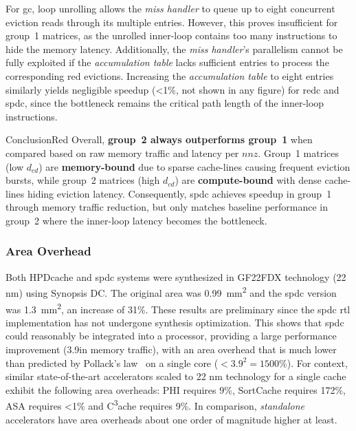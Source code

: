 For \acrshort{gc}, loop unrolling allows the \textit{miss handler} to queue up to eight concurrent \gls{eviction} reads through its multiple entries.
However, this proves insufficient for group~1 matrices, as the unrolled inner-loop contains too many instructions to hide the memory latency.
Additionally, the \textit{miss handler}'s parallelism cannot be fully exploited if the \textit{accumulation table} lacks sufficient entries to process the corresponding \acrshort{red} \glspl{eviction}.
Increasing the \textit{accumulation table} to eight entries similarly yields negligible speedup (<1\%, not shown in any figure) for \acrshort{redc} and \acrlong{spdc}, since the bottleneck remains the critical path length of the inner-loop instructions.

\begin{highlight}{Conclusion}{Red}
    Overall, \textbf{group~2 always outperforms group~1} when compared based on raw memory traffic and latency per $\mathit{nnz}$.
    Group~1 matrices (low $d_{\mathit{cd}}$) are \textbf{memory-bound} due to sparse cache-lines causing frequent \gls{eviction} bursts, while group~2 matrices (high $d_{\mathit{cd}}$) are \textbf{compute-bound} with dense cache-lines hiding \gls{eviction} latency.
    Consequently, \acrlong{spdc} achieves speedup in group~1 through memory traffic reduction, but only matches baseline performance in group~2 where the inner-loop latency becomes the bottleneck.
\end{highlight}

\subsubsection{Area Overhead}

Both HPDcache and \acrlong{spdc} systems were synthesized in GF22FDX technology (22 nm) using Synopsis DC\texttrademark.
The original area was 0.99~mm\textsuperscript{2} and the \acrlong{spdc} version was 1.3~mm\textsuperscript{2}, an increase of 31\%.
These results are preliminary since the \acrlong{spdc} \acrshort{rtl} implementation has not undergone synthesis optimization.
This shows that \acrlong{spdc} could reasonably be integrated into a processor, providing a large performance improvement (3.9\tms in memory traffic), with an area overhead that is much lower than predicted by Pollack's law~\cite{Borkar2007_AreaOverheads} on a single core ($< 3.9^2 = 1500\%$).
For context, similar state-of-the-art accelerators scaled to 22 nm technology for a single cache exhibit the following area overheads: PHI requires 9\%, SortCache requires 172\%, ASA requires <1\% and C\textsuperscript{3}ache requires 9\%.
In comparison, \textit{standalone} accelerators have area overheads about one order of magnitude higher at least.

